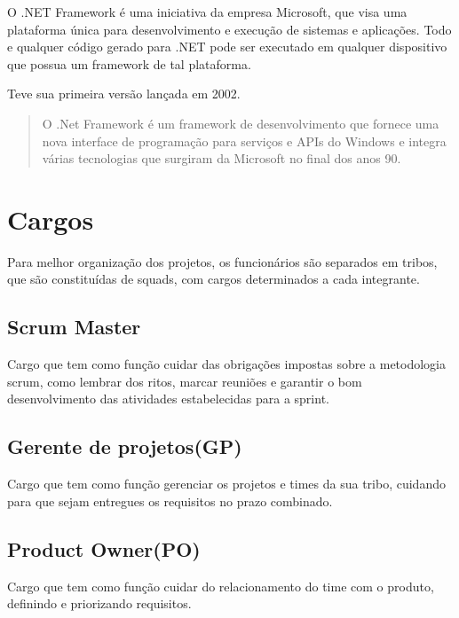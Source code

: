 O .NET Framework é uma iniciativa da empresa Microsoft, que visa uma plataforma única para desenvolvimento e execução de sistemas e aplicações.
Todo e qualquer código gerado para .NET pode ser executado em qualquer dispositivo que possua um framework de tal plataforma.

Teve sua primeira versão lançada em 2002.

\begin{quote}
  
O .Net Framework é um framework de desenvolvimento que fornece uma nova interface de programação para serviços e APIs do Windows e integra várias tecnologias que surgiram da Microsoft no final dos anos 90. \cite{thai2003net}
\end{quote}

\section{Cargos}

Para melhor organização dos projetos, os funcionários são separados em tribos, que são constituídas de squads, com cargos determinados a cada integrante.

\subsection{Scrum Master}

Cargo que tem como função cuidar das obrigações impostas sobre a metodologia scrum, como lembrar dos ritos, marcar reuniões e garantir o bom desenvolvimento das atividades estabelecidas para a sprint.

\subsection{Gerente de projetos(GP)}

Cargo que tem como função gerenciar os projetos e times da sua
 tribo, cuidando para que sejam entregues os requisitos no prazo combinado.

\subsection{Product Owner(PO)}
Cargo que tem como função cuidar do relacionamento do time com o produto,
 definindo e priorizando requisitos.
 